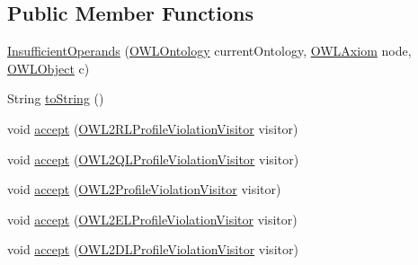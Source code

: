 \subsection*{Public Member Functions}
\begin{DoxyCompactItemize}
\item 
\hyperlink{classorg_1_1semanticweb_1_1owlapi_1_1profiles_1_1_insufficient_operands_a03b3cffe705d8e12f1248a3d5f6b63cc}{Insufficient\-Operands} (\hyperlink{interfaceorg_1_1semanticweb_1_1owlapi_1_1model_1_1_o_w_l_ontology}{O\-W\-L\-Ontology} current\-Ontology, \hyperlink{interfaceorg_1_1semanticweb_1_1owlapi_1_1model_1_1_o_w_l_axiom}{O\-W\-L\-Axiom} node, \hyperlink{interfaceorg_1_1semanticweb_1_1owlapi_1_1model_1_1_o_w_l_object}{O\-W\-L\-Object} c)
\item 
String \hyperlink{classorg_1_1semanticweb_1_1owlapi_1_1profiles_1_1_insufficient_operands_a9c86815db394594243c4fa325545af08}{to\-String} ()
\item 
void \hyperlink{classorg_1_1semanticweb_1_1owlapi_1_1profiles_1_1_insufficient_operands_a05e82363d62adabd687a883bd1758a40}{accept} (\hyperlink{interfaceorg_1_1semanticweb_1_1owlapi_1_1profiles_1_1_o_w_l2_r_l_profile_violation_visitor}{O\-W\-L2\-R\-L\-Profile\-Violation\-Visitor} visitor)
\item 
void \hyperlink{classorg_1_1semanticweb_1_1owlapi_1_1profiles_1_1_insufficient_operands_a35410025411f505448acbe925e7fba64}{accept} (\hyperlink{interfaceorg_1_1semanticweb_1_1owlapi_1_1profiles_1_1_o_w_l2_q_l_profile_violation_visitor}{O\-W\-L2\-Q\-L\-Profile\-Violation\-Visitor} visitor)
\item 
void \hyperlink{classorg_1_1semanticweb_1_1owlapi_1_1profiles_1_1_insufficient_operands_a8e1ed1303772a5acbbd980f246b0999a}{accept} (\hyperlink{interfaceorg_1_1semanticweb_1_1owlapi_1_1profiles_1_1_o_w_l2_profile_violation_visitor}{O\-W\-L2\-Profile\-Violation\-Visitor} visitor)
\item 
void \hyperlink{classorg_1_1semanticweb_1_1owlapi_1_1profiles_1_1_insufficient_operands_a1b0585c8d1d4bd9921e6a4f6b734fc2a}{accept} (\hyperlink{interfaceorg_1_1semanticweb_1_1owlapi_1_1profiles_1_1_o_w_l2_e_l_profile_violation_visitor}{O\-W\-L2\-E\-L\-Profile\-Violation\-Visitor} visitor)
\item 
void \hyperlink{classorg_1_1semanticweb_1_1owlapi_1_1profiles_1_1_insufficient_operands_a506f572b5897e8fa67687658c11be0cc}{accept} (\hyperlink{interfaceorg_1_1semanticweb_1_1owlapi_1_1profiles_1_1_o_w_l2_d_l_profile_violation_visitor}{O\-W\-L2\-D\-L\-Profile\-Violation\-Visitor} visitor)
\end{DoxyCompactItemize}
